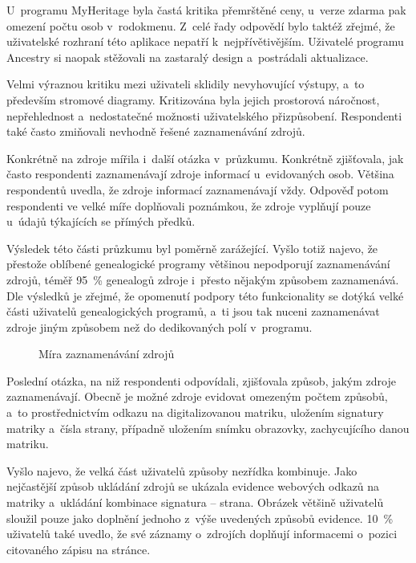 	U~programu MyHeritage byla častá kritika přemrštěné ceny, u~verze zdarma pak omezení počtu osob v~rodokmenu. Z~celé řady odpovědí bylo taktéž zřejmé, že uživatelské rozhraní této aplikace nepatří k~nejpřívětivějším. Uživatelé programu Ancestry si naopak stěžovali na zastaralý design a~postrádali aktualizace.\par
	Velmi výraznou kritiku mezi uživateli sklidily nevyhovující výstupy, a~to především stromové diagramy. Kritizována byla jejich prostorová náročnost, nepřehlednost a~nedostatečné možnosti uživatelského přizpůsobení. Respondenti také často zmiňovali nevhodně řešené zaznamenávání zdrojů.\par
	Konkrétně na zdroje mířila i~další otázka v~průzkumu. Konkrétně zjišťovala, jak často respondenti zaznamenávají zdroje informací u~evidovaných osob. Většina respondentů uvedla, že zdroje informací zaznamenávají vždy. Odpověď  potom respondenti ve velké míře doplňovali poznámkou, že zdroje vyplňují pouze u~údajů týkajících se přímých předků.\par
	Výsledek této části průzkumu byl poměrně zarážející. Vyšlo totiž najevo, že přestože oblíbené genealogické programy většinou nepodporují zaznamenávání zdrojů, téměř 95~\% genealogů zdroje i~přesto nějakým způsobem zaznamenává. Dle výsledků je zřejmé, že opomenutí podpory této funkcionality se dotýká velké části uživatelů genealogických programů, a~ti jsou tak nuceni zaznamenávat zdroje jiným způsobem než do dedikovaných polí v~programu. \par
	\begin{figure}[H]
		\caption{Míra zaznamenávání zdrojů}
		\label{chart:srcwhen}
	\end{figure}
	Poslední otázka, na niž respondenti odpovídali, zjišťovala způsob, jakým zdroje zaznamenávají. Obecně je možné zdroje evidovat omezeným počtem způsobů, a~to prostřednictvím odkazu na digitalizovanou matriku, uložením signatury matriky a~čísla strany, případně uložením snímku obrazovky, zachycujícího danou matriku. \par
	Vyšlo najevo, že velká část uživatelů způsoby nezřídka kombinuje. Jako nejčastější způsob ukládání zdrojů se ukázala evidence webových odkazů na matriky a~ukládání kombinace signatura -- strana. Obrázek většině uživatelů sloužil pouze jako doplnění jednoho z~výše uvedených způsobů evidence. 10~\% uživatelů také uvedlo, že své záznamy o~zdrojích doplňují informacemi o~pozici citovaného zápisu na stránce. \par
